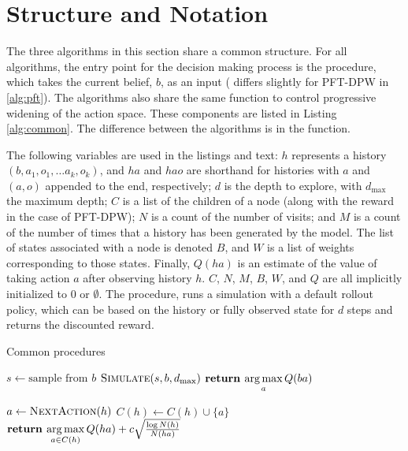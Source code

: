 \section{Structure and Notation}

The three algorithms in this section share a common structure.
For all algorithms, the entry point for the decision making process is the  procedure, which takes the current belief, $b$, as an input ( differs slightly for PFT-DPW in \cref{alg:pft}).
The algorithms also share the same  function to control progressive widening of the action space.
These components are listed in Listing \ref{alg:common}.
The difference between the algorithms is in the  function.

The following variables are used in the listings and text:
$h$ represents a history $(b, a_1, o_1, \dots a_k, o_k)$, and $ha$ and $hao$ are shorthand for histories with $a$ and $(a,o)$ appended to the end, respectively;
$d$ is the depth to explore, with $d_\text{max}$ the maximum depth;
$C$ is a list of the children of a node (along with the reward in the case of PFT-DPW);
$N$ is a count of the number of visits; and $M$ is a count of the number of times that a history has been generated by the model.
The list of states associated with a node is denoted $B$, and $W$ is a list of weights corresponding to those states.
Finally, $Q(ha)$ is an estimate of the value of taking action $a$ after observing history $h$.
$C$, $N$, $M$, $B$, $W$, and $Q$ are all implicitly initialized to \num{0} or $\emptyset$.
The  procedure, runs a simulation with a default rollout policy, which can be based on the history or fully observed state for $d$ steps and returns the discounted reward.

\begin{algorithm}[t]
    \caption{Common procedures} \label{alg:common}
    \begin{algorithmic}[1]
                \State $s \gets \text{sample from }b$
                \State $\Call{Simulate}{s, b, d_\text{max}}$
            \EndFor
            \State $\textbf{return } \underset{a}{\argmax}\, Q(ba)$
        \EndProcedure

                \State $a \gets \Call{NextAction}{h}$
                \State $C(h) \gets C(h) \cup \{a\}$
            \EndIf
            \State $\textbf{return } \underset{a \in C(h)}{\argmax}\, Q(ha) + c \sqrt{\frac{\log N(h)}{N(ha)}}$
        \EndProcedure

    \end{algorithmic}
\end{algorithm}


